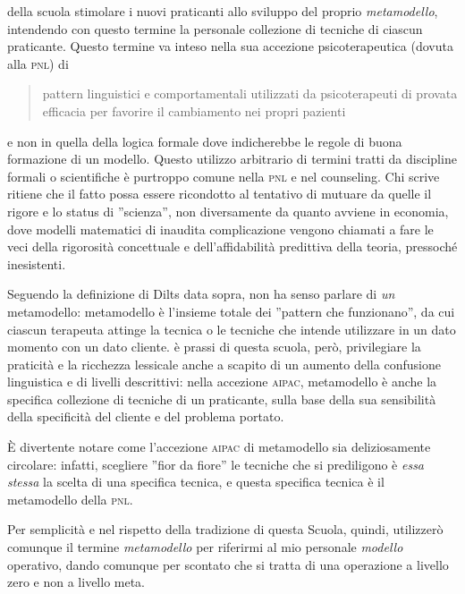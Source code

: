  della scuola stimolare i nuovi praticanti allo sviluppo del proprio \textit{metamodello}, intendendo con questo termine la personale collezione di tecniche di ciascun praticante. Questo termine va inteso nella sua accezione psicoterapeutica (dovuta alla \textsc{pnl}) di%
\begin{quote}
pattern linguistici e comportamentali utilizzati da psicoterapeuti di provata efficacia per favorire il cambiamento nei propri pazienti\cite{magic} 
\end{quote}
e non in quella della logica formale dove indicherebbe le regole di buona formazione di un modello. Questo utilizzo arbitrario di termini tratti da discipline formali o scientifiche è purtroppo comune nella \textsc{pnl} e nel counseling. Chi scrive ritiene che il fatto possa essere ricondotto al tentativo di mutuare da quelle il rigore e lo status di ''scienza'', non diversamente da quanto avviene in economia, dove modelli matematici di inaudita complicazione vengono chiamati a fare le veci della rigorosità concettuale e dell'affidabilità predittiva della teoria, pressoché inesistenti.

Seguendo la definizione di Dilts data sopra, non ha senso parlare di \textit{un} metamodello: metamodello è l'insieme totale dei ''pattern che funzionano'', da cui ciascun terapeuta attinge la tecnica o le tecniche che intende utilizzare in un dato momento con un dato cliente. è prassi di questa scuola, però, privilegiare la praticità e la ricchezza lessicale anche a scapito di un aumento della confusione linguistica e di livelli descrittivi: nella accezione \textsc{aipac}, metamodello è anche la specifica collezione di tecniche di un praticante, sulla base della sua sensibilità della specificità del cliente e del problema portato.

\`{E} divertente notare come l'accezione \textsc{aipac} di metamodello sia deliziosamente circolare: infatti, scegliere ''fior da fiore'' le tecniche che si prediligono è \textit{essa stessa} la scelta di una specifica tecnica, e questa specifica tecnica è il metamodello della \textsc{pnl}.

Per semplicità e nel rispetto della tradizione di questa Scuola, quindi, utilizzerò comunque il termine \textit{metamodello} per riferirmi al mio personale \textit{modello} operativo, dando comunque per scontato che si tratta di una operazione a livello zero e non a livello meta.

